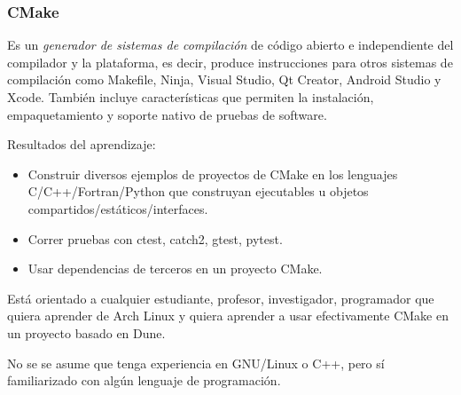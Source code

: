 




\begin{frame}[fragile]
	\frametitle{CMake}
	Es un \emph{generador de sistemas de compilación} de código
	abierto e independiente del compilador y la plataforma, es decir,
	produce instrucciones para otros sistemas de compilación como
	Makefile, Ninja, Visual Studio, Qt Creator, Android Studio y
	Xcode.
	También incluye características que permiten la instalación,
	empaquetamiento y soporte nativo de pruebas de software.
	
	Resultados del aprendizaje:

	\begin{itemize}
		\item

		Construir diversos ejemplos de proyectos de CMake en los
		lenguajes C/C++/Fortran/Python que construyan ejecutables u
		objetos compartidos/estáticos/interfaces.

		\item

		Correr pruebas con ctest, catch2, gtest, pytest.

		\item

		Usar dependencias de terceros en un proyecto CMake.
	\end{itemize}

	Está orientado a cualquier estudiante, profesor, investigador,
	programador que quiera aprender de Arch Linux y quiera aprender
	a usar efectivamente CMake en un proyecto basado en Dune.

	No se se asume que tenga experiencia en GNU/Linux o C++, pero
	sí familiarizado con algún lenguaje de programación.

\end{frame}

